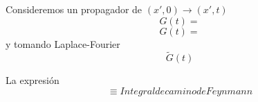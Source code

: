 \documentclass[10pt,oneside]{CBFT_book}
\begin{document}
Consideremos un propagador de $(x',0) \to (x',t)$
\[
	G(t) =
\]
\[
	G(t) =
\]
y tomando Laplace-Fourier 
\[
	\tilde{G}(t)
\]

La expresión 
\[
	\equiv Integral de camino de Feynmann
\]


















% 
% 
\end{document}
